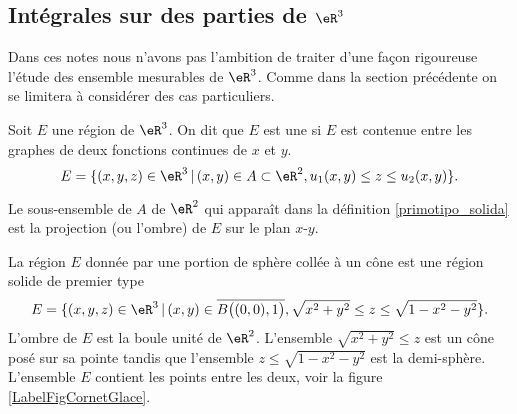 \subsection{Intégrales sur des parties de $\eR^3$}
Dans ces notes nous n'avons pas l'ambition de traiter d'une façon rigoureuse l'étude des ensemble mesurables de $\eR^3$. Comme dans la section précédente on se limitera à considérer des cas particuliers. 
\begin{definition}\label{primotipo_solida}
	Soit $E$ une région de  $\eR^3$. On dit que $E$ est une  si $E$ est contenue entre les graphes de deux fonctions continues de $x$ et $y$.
\[
E=\{(x,y,z)\in\eR^3\, \vert \, (x,y)\in A\subset \eR^2, u_1(x,y)\leq z\leq u_2(x,y) \}. 
\]   
\end{definition}
Le sous-ensemble de $A$  de $\eR^2$ qui apparaît dans la définition \ref{primotipo_solida} est la projection (ou l'ombre) de $E$ sur le plan $x$-$y$. 

\begin{example}\label{cornet}
 La région $E$ donnée par une portion de sphère collée à un cône est une région solide de premier type
 \begin{equation}
     E=\{(x,y,z)\in\eR^3\, \vert \, (x,y)\in \overline{  B\big((0,0),1\big)}, \sqrt{x^2+y^2}\leq z\leq \sqrt{1-x^2-y^2} \}. 
 \end{equation}
L'ombre de $E$ est la boule unité de $\eR^2$. L'ensemble $\sqrt{x^2+y^2}\leq z$ est un cône posé sur sa pointe tandis que l'ensemble $z\leq\sqrt{ 1-x^2-y^2 }$ est la demi-sphère. L'ensemble $E$ contient les points entre les deux, voir la figure \ref{LabelFigCornetGlace}.
\newcommand{\CaptionFigCornetGlace}{Il faut voir ça en trois dimensions.}


\end{example}

